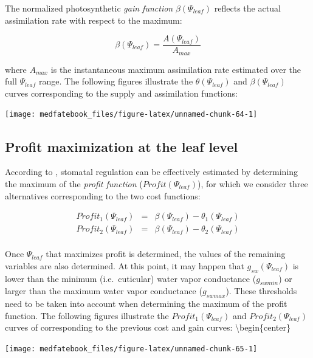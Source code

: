 \documentclass[]{book}
\begin{document}
The normalized photosynthetic \emph{gain function}
\(\beta(\Psi_{leaf})\) reflects the actual assimilation rate with
respect to the maximum:

\begin{equation}
\beta(\Psi_{leaf}) = \frac{A(\Psi_{leaf})}{A_{max}}
\end{equation}

where \(A_{max}\) is the instantaneous maximum assimilation rate
estimated over the full \(\Psi_{leaf}\) range. The following figures
illustrate the \(\theta(\Psi_{leaf})\) and \(\beta(\Psi_{leaf})\) curves
corresponding to the supply and assimilation functions:

\begin{center}\texttt{[image: medfatebook\_files/figure-latex/unnamed-chunk-64-1]} \end{center}

\subsection{Profit maximization at the leaf
level}\label{profit-maximization-at-the-leaf-level}

According to \citet{Sperry2016}, stomatal regulation can be effectively
estimated by determining the maximum of the \emph{profit function}
(\(Profit(\Psi_{leaf})\)), for which we consider three alternatives
corresponding to the two cost functions:

\begin{eqnarray}
Profit_1(\Psi_{leaf}) &=& \beta(\Psi_{leaf})-\theta_1(\Psi_{leaf})\\
Profit_2(\Psi_{leaf}) &=& \beta(\Psi_{leaf})-\theta_2(\Psi_{leaf})\\
\end{eqnarray}

Once \(\Psi_{leaf}\) that maximizes profit is determined, the values of
the remaining variables are also determined. At this point, it may
happen that \(g_{sw}(\Psi_{leaf})\) is lower than the minimum
(i.e.~cuticular) water vapor conductance (\(g_{swmin}\)) or larger than
the maximum water vapor conductance (\(g_{swmax}\)). These thresholds
need to be taken into account when determining the maximum of the profit
function. The following figures illustrate the \(Profit_1(\Psi_{leaf})\)
and \(Profit_2(\Psi_{leaf})\) curves of corresponding to the previous
cost and gain curves: \textbackslash{}begin\{center\}

\begin{center}\texttt{[image: medfatebook\_files/figure-latex/unnamed-chunk-65-1]} \end{center}
\end{document}
